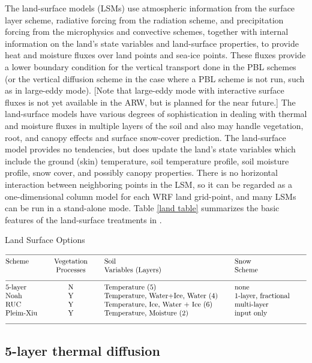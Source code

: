 The land-surface models (LSMs) use atmospheric information from the surface layer scheme, 
radiative forcing from the radiation scheme, and precipitation forcing from the 
microphysics and convective schemes, together with internal information on the 
land's state variables and land-surface properties, to provide heat and moisture 
fluxes over land points and sea-ice points. These fluxes provide a lower boundary 
condition for the vertical transport done in the PBL schemes (or the vertical 
diffusion scheme in the case where a PBL scheme is not run, such as in 
large-eddy mode). [Note that large-eddy mode with interactive surface fluxes is 
not yet available in the ARW, but is planned for the near future.] The land-surface 
models have various degrees of sophistication in dealing with thermal and moisture 
fluxes in multiple layers of the soil and also may handle vegetation, root, and 
canopy effects and surface snow-cover prediction. The land-surface model provides 
no tendencies, but does update the land's state variables which include the ground (skin) 
temperature, soil temperature profile, soil moisture profile, snow cover, and 
possibly canopy properties. There is no horizontal interaction between neighboring
points in the LSM, so it can be regarded as a one-dimensional column model for
each WRF land grid-point, and many LSMs can be run in a stand-alone mode.
Table \ref{land table} summarizes the basic features of the land-surface
treatments in {\wrf}.

\begin{table}
\caption{Land Surface Options}
\label{land table}
$$\vbox
{\halign{#\hfil \qquad & \hfil#\hfil \qquad &
#\hfil \qquad & #\hfil \qquad &  #\hfil \cr
\multispan4\hrulefill \cr
Scheme          & Vegetation   &  Soil                            & Snow               \cr
                & Processes    &  Variables (Layers)              & Scheme               \cr
\multispan4\hrulefill \cr
5-layer         &      N    &  Temperature (5)                    &  none  \cr
Noah            &      Y    &  Temperature, Water+Ice, Water (4)  &  1-layer, fractional  \cr
RUC             &      Y    &  Temperature, Ice, Water + Ice (6)          &  multi-layer   \cr
Pleim-Xiu       &      Y    &  Temperature, Moisture (2)          &  input only   \cr
\multispan4\hrulefill \cr
}}$$
\end{table}

\subsection{5-layer thermal diffusion}

